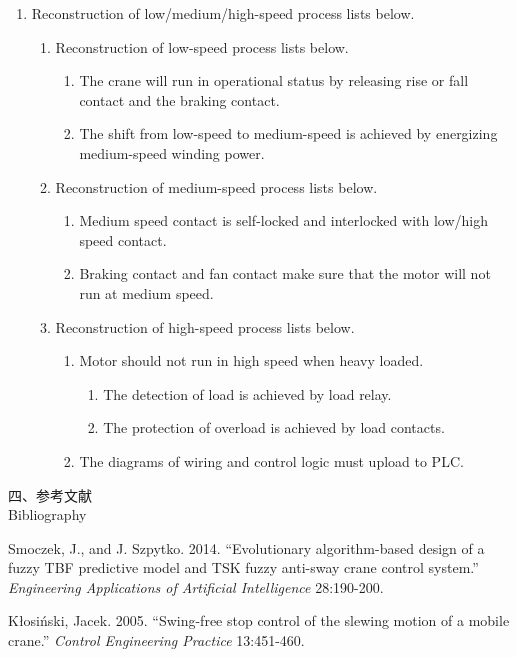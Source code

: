 \documentclass[a4paper]{article}
\renewcommand{\Large}{\fontsize{12pt}{\baselineskip}\selectfont}
\begin{document}
\begin{enumerate}
\item Reconstruction of low/medium/high-speed process lists below.
	\begin{enumerate}
\item Reconstruction of low-speed process lists below.
		\begin{enumerate}
\item The crane will run in operational status by releasing rise or fall  contact and the braking contact.
\item The shift from low-speed to medium-speed is achieved by energizing medium-speed winding power.
		\end{enumerate}
\item Reconstruction of medium-speed process lists below.
	\begin{enumerate}
\item Medium speed contact is self-locked and  interlocked with  low/high speed contact.
\item Braking contact and fan contact make sure that the motor will not run at medium speed.
	\end{enumerate}
\item Reconstruction of high-speed process lists below.
	\begin{enumerate}
\item Motor should not run in high speed when heavy loaded.
	\begin{enumerate}
\item The detection of load is achieved  by load relay.
\item The protection of overload is achieved by load contacts.
	\end{enumerate}
\item The diagrams of wiring and control logic must upload to PLC.
	\end{enumerate} 
	\end{enumerate}
	\end{enumerate}

{ \Large 四、参考文献} \\
{ \Large Bibliography} 

\setlength{\hangindent}{4em}
Smoczek, J., and J. Szpytko. 2014. ``Evolutionary algorithm-based design of a fuzzy TBF predictive model and TSK fuzzy anti-sway crane control system.''
\textit{Engineering Applications of Artificial Intelligence} 28:190-200. \par

\setlength{\hangindent}{4em}
Kłosiński, Jacek. 2005. ``Swing-free stop control of the slewing motion of a mobile crane.''
\textit{Control Engineering Practice} 13:451-460. \par
\end{document}
